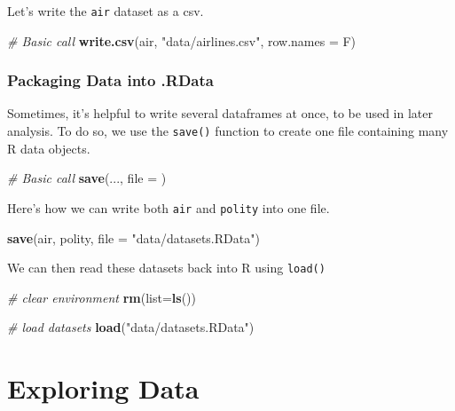 \documentclass[]{book}
\newenvironment{Shaded}{\begin{snugshade}}{\end{snugshade}}
\newcommand{\KeywordTok}[1]{\textcolor[rgb]{0.13,0.29,0.53}{\textbf{#1}}}
\newcommand{\DataTypeTok}[1]{\textcolor[rgb]{0.13,0.29,0.53}{#1}}
\newcommand{\StringTok}[1]{\textcolor[rgb]{0.31,0.60,0.02}{#1}}
\newcommand{\CommentTok}[1]{\textcolor[rgb]{0.56,0.35,0.01}{\textit{#1}}}
\newcommand{\NormalTok}[1]{#1}
\begin{document}
Let's write the \texttt{air} dataset as a csv.

\begin{Shaded}
\begin{Highlighting}[]
\CommentTok{# Basic call}
\KeywordTok{write.csv}\NormalTok{(air, }\StringTok{"data/airlines.csv"}\NormalTok{, }\DataTypeTok{row.names =}\NormalTok{ F)}
\end{Highlighting}
\end{Shaded}

\subsubsection*{Packaging Data into
.RData}\label{packaging-data-into-.rdata}

Sometimes, it's helpful to write several dataframes at once, to be used
in later analysis. To do so, we use the \texttt{save()} function to
create one file containing many R data objects.

\begin{Shaded}
\begin{Highlighting}[]
\CommentTok{# Basic call}
\KeywordTok{save}\NormalTok{(..., }\DataTypeTok{file =}\NormalTok{ )}
\end{Highlighting}
\end{Shaded}

Here's how we can write both \texttt{air} and \texttt{polity} into one
file.

\begin{Shaded}
\begin{Highlighting}[]
\KeywordTok{save}\NormalTok{(air, polity, }\DataTypeTok{file =} \StringTok{"data/datasets.RData"}\NormalTok{)}
\end{Highlighting}
\end{Shaded}

We can then read these datasets back into R using \texttt{load()}

\begin{Shaded}
\begin{Highlighting}[]
\CommentTok{# clear environment}
\KeywordTok{rm}\NormalTok{(}\DataTypeTok{list=}\KeywordTok{ls}\NormalTok{())}

\CommentTok{# load datasets}
\KeywordTok{load}\NormalTok{(}\StringTok{"data/datasets.RData"}\NormalTok{)}
\end{Highlighting}
\end{Shaded}

\section{Exploring Data}\label{exploring-data}
\end{document}
